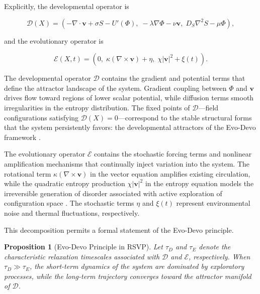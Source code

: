 \documentclass[12pt]{article}
\newtheorem{proposition}{Proposition}[section]
\begin{document}
Explicitly, the developmental operator is

\begin{equation}
\mathcal{D}(X) =
\left(
-\nabla \cdot \mathbf{v} + \sigma S - U'(\Phi),\;
-\lambda \nabla \Phi - \nu \mathbf{v},\;
D_S \nabla^2 S - \mu \Phi
\right),
\label{eq:Dop}
\end{equation}

and the evolutionary operator is

\begin{equation}
\mathcal{E}(X, t) =
\left(
0,\;
\kappa (\nabla \times \mathbf{v}) + \eta,\;
\chi |\mathbf{v}|^2 + \xi(t)
\right).
\label{eq:Eop}
\end{equation}

The developmental operator $\mathcal{D}$ contains the gradient and potential terms that define the attractor landscape of the system. Gradient coupling between $\Phi$ and $\mathbf{v}$ drives flow toward regions of lower scalar potential, while diffusion terms smooth irregularities in the entropy distribution. The fixed points of $\mathcal{D}$---field configurations satisfying $\mathcal{D}(X) = 0$---correspond to the stable structural forms that the system persistently favors: the developmental attractors of the Evo-Devo framework \cite{kauffman1993,strogatz1994}.

The evolutionary operator $\mathcal{E}$ contains the stochastic forcing terms and nonlinear amplification mechanisms that continually inject variation into the system. The rotational term $\kappa(\nabla \times \mathbf{v})$ in the vector equation amplifies existing circulation, while the quadratic entropy production $\chi|\mathbf{v}|^2$ in the entropy equation models the irreversible generation of disorder associated with active exploration of configuration space \cite{nicolis1977,landauer1961}. The stochastic terms $\eta$ and $\xi(t)$ represent environmental noise and thermal fluctuations, respectively.

This decomposition permits a formal statement of the Evo-Devo principle.

\begin{proposition}[Evo-Devo Principle in RSVP]
Let $\tau_D$ and $\tau_E$ denote the characteristic relaxation timescales associated with $\mathcal{D}$ and $\mathcal{E}$, respectively. When $\tau_D \gg \tau_E$, the short-term dynamics of the system are dominated by exploratory processes, while the long-term trajectory converges toward the attractor manifold of $\mathcal{D}$.
\end{proposition}
\end{document}
